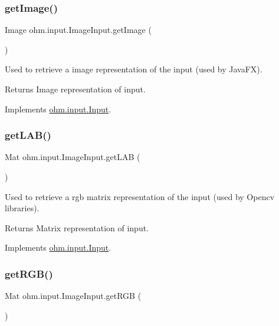 \subsubsection{\texorpdfstring{get\+Image()}{getImage()}}
{\footnotesize\ttfamily Image ohm.\+input.\+Image\+Input.\+get\+Image (\begin{DoxyParamCaption}{ }\end{DoxyParamCaption})}

Used to retrieve a image representation of the input (used by Java\+FX). \begin{DoxyReturn}{Returns}
Image representation of input. 
\end{DoxyReturn}


Implements \hyperlink{interfaceohm_1_1input_1_1_input_aecea73d845b9c88e69294dadcd15e4fe}{ohm.\+input.\+Input}.

\hypertarget{classohm_1_1input_1_1_image_input_a4f55591040c8129f3768948525d34863}{}\label{classohm_1_1input_1_1_image_input_a4f55591040c8129f3768948525d34863} 
\subsubsection{\texorpdfstring{get\+L\+A\+B()}{getLAB()}}
{\footnotesize\ttfamily Mat ohm.\+input.\+Image\+Input.\+get\+L\+AB (\begin{DoxyParamCaption}{ }\end{DoxyParamCaption})}

Used to retrieve a rgb matrix representation of the input (used by Opencv libraries). \begin{DoxyReturn}{Returns}
Matrix representation of input. 
\end{DoxyReturn}


Implements \hyperlink{interfaceohm_1_1input_1_1_input_a3264bf8e72c6442076453b5d356b6534}{ohm.\+input.\+Input}.

\hypertarget{classohm_1_1input_1_1_image_input_aad0a18c0396fba14d5e1d74c08a592e6}{}\label{classohm_1_1input_1_1_image_input_aad0a18c0396fba14d5e1d74c08a592e6} 
\subsubsection{\texorpdfstring{get\+R\+G\+B()}{getRGB()}}
{\footnotesize\ttfamily Mat ohm.\+input.\+Image\+Input.\+get\+R\+GB (\begin{DoxyParamCaption}{ }\end{DoxyParamCaption})}

